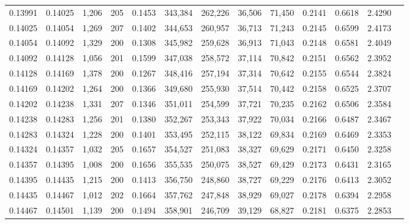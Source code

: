 \begin{tabular}{rrrrrrrrrrrrr}
0.13991 & 0.14025 & 1,206 & 205 &                                     0.1453 & 343,384 & 262,226 &  36,506 &  71,450 & 0.2141 & 0.6618 & 2.4290 \\
0.14025 & 0.14054 & 1,269 & 207 &                                     0.1402 & 344,653 & 260,957 &  36,713 &  71,243 & 0.2145 & 0.6599 & 2.4173 \\
0.14054 & 0.14092 & 1,329 & 200 &                                     0.1308 & 345,982 & 259,628 &  36,913 &  71,043 & 0.2148 & 0.6581 & 2.4049 \\
0.14092 & 0.14128 & 1,056 & 201 &                                     0.1599 & 347,038 & 258,572 &  37,114 &  70,842 & 0.2151 & 0.6562 & 2.3952 \\
0.14128 & 0.14169 & 1,378 & 200 &                                     0.1267 & 348,416 & 257,194 &  37,314 &  70,642 & 0.2155 & 0.6544 & 2.3824 \\
0.14169 & 0.14202 & 1,264 & 200 &                                     0.1366 & 349,680 & 255,930 &  37,514 &  70,442 & 0.2158 & 0.6525 & 2.3707 \\
0.14202 & 0.14238 & 1,331 & 207 &                                     0.1346 & 351,011 & 254,599 &  37,721 &  70,235 & 0.2162 & 0.6506 & 2.3584 \\
0.14238 & 0.14283 & 1,256 & 201 &                                     0.1380 & 352,267 & 253,343 &  37,922 &  70,034 & 0.2166 & 0.6487 & 2.3467 \\
0.14283 & 0.14324 & 1,228 & 200 &                                     0.1401 & 353,495 & 252,115 &  38,122 &  69,834 & 0.2169 & 0.6469 & 2.3353 \\
0.14324 & 0.14357 & 1,032 & 205 &                                     0.1657 & 354,527 & 251,083 &  38,327 &  69,629 & 0.2171 & 0.6450 & 2.3258 \\
0.14357 & 0.14395 & 1,008 & 200 &                                     0.1656 & 355,535 & 250,075 &  38,527 &  69,429 & 0.2173 & 0.6431 & 2.3165 \\
0.14395 & 0.14435 & 1,215 & 200 &                                     0.1413 & 356,750 & 248,860 &  38,727 &  69,229 & 0.2176 & 0.6413 & 2.3052 \\
0.14435 & 0.14467 & 1,012 & 202 &                                     0.1664 & 357,762 & 247,848 &  38,929 &  69,027 & 0.2178 & 0.6394 & 2.2958 \\
0.14467 & 0.14501 & 1,139 & 200 &                                     0.1494 & 358,901 & 246,709 &  39,129 &  68,827 & 0.2181 & 0.6375 & 2.2853 \\

\end{tabular}
